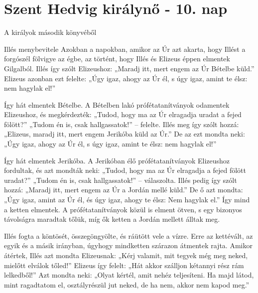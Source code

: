 \documentclass[twoside]{article}
\begin{document}


\section*{Szent Hedvig királynő - 10. nap}

A királyok második könyvéből

\begin{lectio}{Illés menybevitele}
\noindent Azokban a napokban, amikor az Úr azt akarta, hogy Illést a forgószél fölvigye az égbe, az történt, hogy Illés és Elizeus éppen elmentek Gilgalból. Illés így szólt Elizeushoz: „Maradj itt, mert engem az Úr Bételbe küld.” Elizeus azonban ezt felelte: „Úgy igaz, ahogy az Úr él, s úgy igaz, amint te élsz: nem hagylak el!”

Így hát elmentek Bételbe. A Bételben lakó prófétatanítványok odamentek Elizeushoz, és megkérdezték: „Tudod, hogy ma az Úr elragadja uradat a fejed fölött?” „Tudom én is, csak hallgassatok!” – felelte. Illés meg így szólt hozzá: „Elizeus, maradj itt, mert engem Jerikóba küld az Úr.” De az ezt mondta neki: „Úgy igaz, ahogy az Úr él, s úgy igaz, amint te élsz: nem hagylak el!”

Így hát elmentek Jerikóba. A Jerikóban élő prófétatanítványok Elizeushoz fordultak, és azt mondták neki: „Tudod, hogy ma az Úr elragadja a fejed fölött uradat?” „Tudom én is, csak hallgassatok!” – válaszolta. Illés pedig így szólt hozzá: „Maradj itt, mert engem az Úr a Jordán mellé küld.” De ő azt mondta: „Úgy igaz, amint az Úr él, és úgy igaz, ahogy te élsz: Nem hagylak el.” Így mind a ketten elmentek. A prófétatanítványok közül is elment ötven, s egy bizonyos távolságra maradtak tőlük, míg ők ketten a Jordán mellett álltak meg.

Illés fogta a köntösét, összegöngyölte, és ráütött vele a vízre. Erre az kettévált, az egyik és a másik irányban, úgyhogy mindketten szárazon átmentek rajta. Amikor átértek, Illés azt mondta Elizeusnak: „Kérj valamit, mit tegyek még meg neked, mielőtt elválok tőled!” Elizeus így felelt: „Hát akkor szálljon kétannyi rész rám lelkedből!” Azt mondta neki: „Olyat kértél, amit nehéz teljesíteni. Ha majd látod, mint ragadtatom el, osztályrészül jut neked, de ha nem, akkor nem kapod meg.”


\end{lectio}
\end{document}
